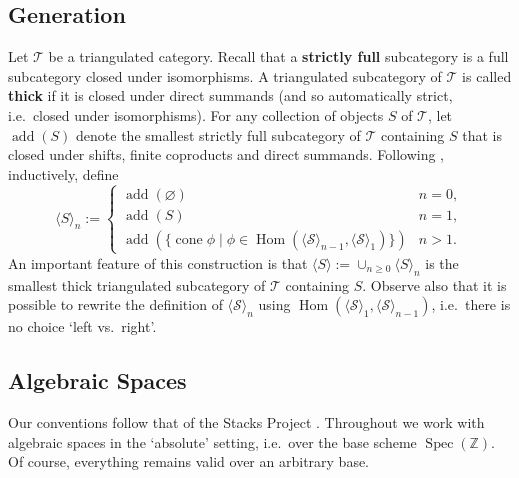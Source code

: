 \documentclass[11pt]{amsart}
\theoremstyle{plain}
\theoremstyle{definition}
\numberwithin{equation}{section}
\numberwithin{theorem}{section}
\begin{document}
\subsection{Generation}
\label{sec:prelim_generation}

Let $\mathcal{T}$ be a triangulated category. 
Recall that a \textbf{strictly full} subcategory is a full subcategory closed under isomorphisms. 
A triangulated subcategory of $\mathcal{T}$ is called \textbf{thick} if it is closed under direct summands (and so automatically strict, i.e.\ closed under isomorphisms). 
For any collection of objects $S$ of $\mathcal{T}$, let $\operatorname{add}(S)$ denote the smallest strictly full subcategory of $\mathcal{T}$ containing $S$ that is closed under shifts, finite coproducts and direct summands.
Following \cite{Bondal/VandenBergh:2003}, inductively, define
\begin{displaymath}
    \langle S\rangle_n :=
    \begin{cases}
        \operatorname{add}(\varnothing) & n=0, \\
        \operatorname{add}(S) & n=1, \\
        \operatorname{add}(\{ \operatorname{cone}\phi \mid \phi \in \operatorname{Hom}(\langle \mathcal{S} \rangle_{n-1}, \langle \mathcal{S} \rangle_1) \}) & n>1.
    \end{cases}
\end{displaymath}
An important feature of this construction is that $\langle S \rangle := \cup_{n\geq 0} \langle  S \rangle_n$ is the smallest thick triangulated subcategory of $\mathcal{T}$ containing $S$. 
Observe also that it is possible to rewrite the definition of $\langle \mathcal{S} \rangle_n$ using $\operatorname{Hom}(\langle \mathcal{S} \rangle_1, \langle \mathcal{S} \rangle_{n-1})$, i.e.\ there is no choice `left vs.\ right'. 

\subsection{Algebraic Spaces}
\label{sec:prelim_spaces}

Our conventions follow that of the Stacks Project \cite{StacksProject}. 
Throughout we work with algebraic spaces in the `absolute' setting, i.e.\ over the base scheme $\operatorname{Spec}(\mathbb{Z})$. Of course, everything remains valid over an arbitrary base.
\end{document}
